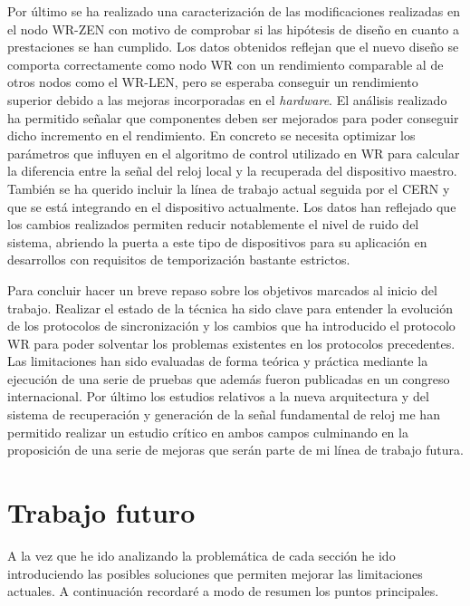 Por último se ha realizado una caracterización de las modificaciones realizadas 
en el nodo WR-ZEN con motivo de comprobar si las hipótesis de diseño en cuanto 
a prestaciones se han cumplido. Los datos obtenidos reflejan que el nuevo 
diseño se comporta correctamente como nodo WR con un rendimiento comparable al 
de otros nodos como el WR-LEN, pero se esperaba conseguir un rendimiento 
superior debido a las mejoras incorporadas en el \textit{hardware}. El análisis 
realizado ha permitido señalar que componentes deben ser mejorados para poder 
conseguir dicho incremento en el rendimiento. En concreto se necesita optimizar 
los parámetros que influyen en el algoritmo de control utilizado en WR para 
calcular la diferencia entre la señal del reloj local y la recuperada del 
dispositivo maestro. También se ha querido incluir la línea de trabajo actual 
seguida por el CERN y que se está integrando en el dispositivo actualmente. Los 
datos han reflejado que los cambios realizados permiten reducir notablemente el 
nivel de ruido del sistema, abriendo la puerta a este tipo de dispositivos para 
su aplicación en desarrollos con requisitos de temporización bastante estrictos.

Para concluir hacer un breve repaso sobre los objetivos marcados al inicio del 
trabajo. Realizar el estado de la técnica ha sido clave para entender la 
evolución de los protocolos de sincronización y los cambios que ha introducido 
el protocolo WR para poder solventar los problemas existentes en los protocolos 
precedentes. Las limitaciones han sido evaluadas de forma teórica y práctica 
mediante la ejecución de una serie de pruebas que además fueron publicadas en 
un congreso internacional. Por último los estudios relativos a la nueva 
arquitectura y del sistema de recuperación y generación de la señal fundamental 
de reloj me han permitido realizar un estudio crítico en ambos campos 
culminando en la proposición de una serie de mejoras que serán parte de mi 
línea de trabajo futura.

\section{Trabajo futuro}

A la vez que he ido analizando la problemática de cada sección he ido 
introduciendo las posibles soluciones que permiten mejorar las limitaciones 
actuales. A continuación recordaré a modo de resumen los puntos principales.

